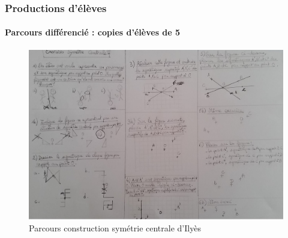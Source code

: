 \subsubsection*{Productions d'élèves}\label{Prod_eleves_ju}
\paragraph{Parcours différencié : copies d'élèves de 5 \\}
\begin{figure}[!h]
	\centering
	\includegraphics[scale=0.5]{img/symetrie_Ilyes.jpg}
	\caption{Parcours construction symétrie centrale d'Ilyès}
\end{figure}
